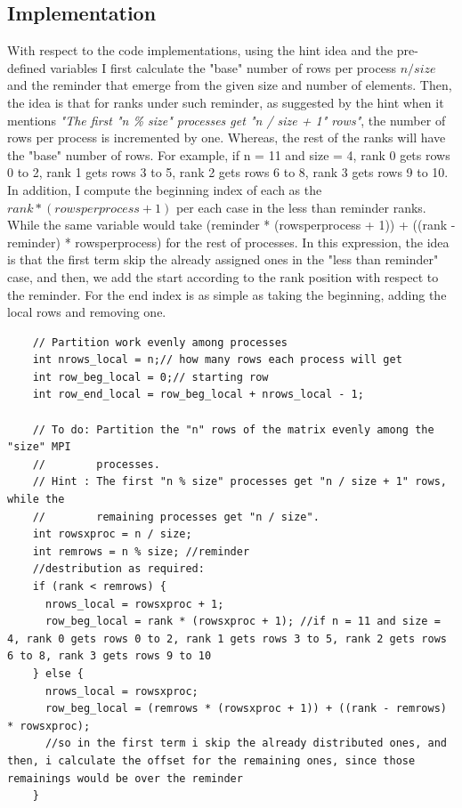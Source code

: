 \documentclass[unicode,11pt,a4paper,oneside,numbers=endperiod,openany]{scrartcl}
\begin{document}
\subsection{Implementation}
With respect to the code implementations, using the hint idea and the pre-defined variables I first calculate the "base" number of rows per process $n / size$ and the reminder 
that emerge from the given size and number of elements. Then, the idea is that for ranks under such reminder, as suggested by the hint when it mentions \textit{"The first "n \% size" processes get "n / size + 1" rows"},
the number of rows per process is incremented by one. Whereas, the rest of the ranks will have the "base" number of rows. For example,
if n = 11 and size = 4, rank 0 gets rows 0 to 2, rank 1 gets rows 3 to 5, rank 2 gets rows 6 to 8, rank 3 gets rows 9 to 10. In addition, I compute the beginning index of 
each as the $rank * (rows per process + 1)$ per each case in the less than reminder ranks. While the same variable would take (reminder * (rowsperprocess + 1)) + ((rank - reminder) * rowsperprocess) for the rest of processes. 
In this expression, the idea is that the first term skip the already assigned ones in the "less than reminder" case, and then, we add the start according to the rank position with respect to the reminder. 
For the end index is as simple as taking the beginning, adding the local rows and removing one. 

\begin{lstlisting}
    // Partition work evenly among processes
    int nrows_local = n;// how many rows each process will get
    int row_beg_local = 0;// starting row
    int row_end_local = row_beg_local + nrows_local - 1;
  
    // To do: Partition the "n" rows of the matrix evenly among the "size" MPI
    //        processes.
    // Hint : The first "n % size" processes get "n / size + 1" rows, while the
    //        remaining processes get "n / size".
    int rowsxproc = n / size;
    int remrows = n % size; //reminder 
    //destribution as required:
    if (rank < remrows) {
      nrows_local = rowsxproc + 1;
      row_beg_local = rank * (rowsxproc + 1); //if n = 11 and size = 4, rank 0 gets rows 0 to 2, rank 1 gets rows 3 to 5, rank 2 gets rows 6 to 8, rank 3 gets rows 9 to 10
    } else {
      nrows_local = rowsxproc;
      row_beg_local = (remrows * (rowsxproc + 1)) + ((rank - remrows) * rowsxproc); 
      //so in the first term i skip the already distributed ones, and then, i calculate the offset for the remaining ones, since those remainings would be over the reminder 
    }
\end{lstlisting}
\end{document}
